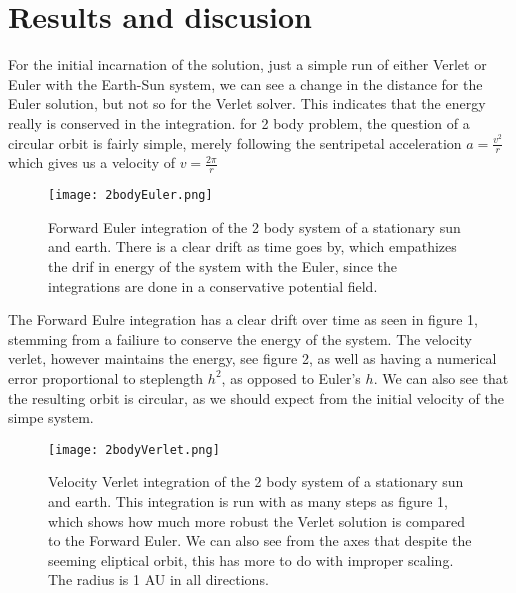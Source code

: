 \documentclass[10pt, twocolumn]{revtex4-1}
\begin{document}
\section{Results and discusion}

For the initial incarnation of the solution, just a simple run of either Verlet or Euler with the Earth-Sun system, we can see a change in the distance
for the Euler solution, but not so for the Verlet solver. This indicates that the energy really is conserved in the integration. for 2 body problem, the
question of a circular orbit is fairly simple, merely following the sentripetal acceleration $a = \frac{v^2}{r}$ which gives us a velocity of 
$v = \frac{2\pi }{r}$

\begin{figure}[hbtp]
    \texttt{[image: 2bodyEuler.png]}
    \caption{Forward Euler integration of the 2 body system of a stationary sun and earth. 
        There is a clear drift as time goes by, which empathizes the drif in energy of the 
        system with the Euler, since the integrations are done in a conservative potential
        field.} 
    \label{}
\end{figure}

The Forward Eulre integration has a clear drift over time as seen in figure 1, stemming from a failiure to conserve the energy of the system. 
The velocity verlet, however maintains the energy, see figure 2, as well as having a numerical error proportional to steplength $h^2$, as 
opposed to Euler's $h$. We can also see that the resulting orbit is circular, as we should expect from the initial velocity of the simpe system. 


\begin{figure}[hbtp]
    \texttt{[image: 2bodyVerlet.png]}
    \caption{Velocity Verlet integration of the 2 body system of a stationary sun and earth.
        This integration is run with as many steps as figure 1, which shows how much more robust
        the Verlet solution is compared to the Forward Euler. We can also see from the axes that 
        despite the seeming eliptical orbit, this has more to do with improper scaling. The radius
        is 1 AU in all directions. } 
    \label{}
\end{figure}
\end{document}
